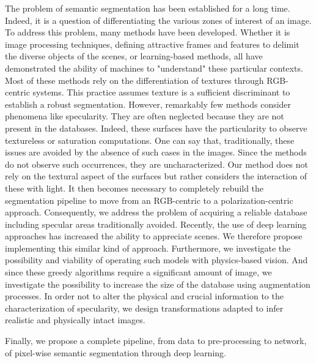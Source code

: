 The problem of semantic segmentation has been established for a long time. Indeed, it is a question of differentiating the various zones of interest of an image. To address this problem, many methods have been developed.
Whether it is image processing techniques, defining attractive frames and features to delimit the diverse objects of the scenes, or learning-based methods, all have demonstrated the ability of machines to "understand" these particular contexts. Most of these methods rely on the differentiation of textures through RGB-centric systems. This practice assumes texture is a sufficient discriminant to establish a robust segmentation. However, remarkably few methods consider phenomena like specularity. They are often neglected because they are not present in the databases. Indeed, these surfaces have the particularity to observe textureless or saturation computations. One can say that, traditionally, these issues are avoided by the absence of such cases in the images. Since the methods do not observe such occurrences, they are uncharacterized.
Our method does not rely on the textural aspect of the surfaces but rather considers the interaction of these with light.
It then becomes necessary to completely rebuild the segmentation pipeline to move from an RGB-centric to a polarization-centric approach. Consequently, we address the problem of acquiring a reliable database including specular areas traditionally avoided. 
Recently, the use of deep learning approaches has increased the ability to appreciate scenes. We therefore propose implementing this similar kind of approach. Furthermore, we investigate the possibility and viability of operating such models with physics-based vision. 
And since these greedy algorithms require a significant amount of image, we investigate the possibility to increase the size of the database using augmentation processes. In order not to alter the physical and crucial information to the characterization of specularity, we design transformations adapted to infer realistic and physically intact images.

Finally, we propose a complete pipeline, from data to pre-processing to network, of pixel-wise semantic segmentation through deep learning.

